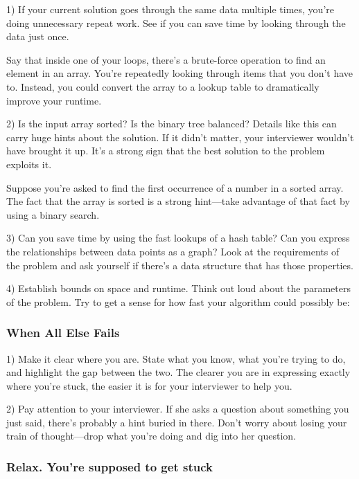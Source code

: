 \documentclass{article}
\begin{document}
1)  If your current solution goes through the same data multiple times, you’re doing unnecessary repeat work. See if you can save time by looking through the data just once.

Say that inside one of your loops, there’s a brute-force operation to find an element in an array. You’re repeatedly looking through items that you don’t have to. Instead, you could convert the array to a lookup table to dramatically improve your runtime.

2)  Is the input array sorted? Is the binary tree balanced? Details like this can carry huge hints about the solution. If it didn’t matter, your interviewer wouldn’t have brought it up. It’s a strong sign that the best solution to the problem exploits it.

Suppose you’re asked to find the first occurrence of a number in a sorted array. The fact that the array is sorted is a strong hint—take advantage of that fact by using a binary search.

3)  Can you save time by using the fast lookups of a hash table? Can you express the relationships between data points as a graph? Look at the requirements of the problem and ask yourself if there’s a data structure that has those properties.


4) Establish bounds on space and runtime. Think out loud about the parameters of the problem. Try to get a sense for how fast your algorithm could possibly be:


\subsubsection{When All Else Fails}


1) Make it clear where you are. State what you know, what you’re trying to do, and highlight the gap between the two. The clearer you are in expressing exactly where you’re stuck, the easier it is for your interviewer to help you.

2) Pay attention to your interviewer. If she asks a question about something you just said, there’s probably a hint buried in there. Don’t worry about losing your train of thought—drop what you’re doing and dig into her question.


\subsubsection{Relax. You’re supposed to get stuck}
\end{document}
